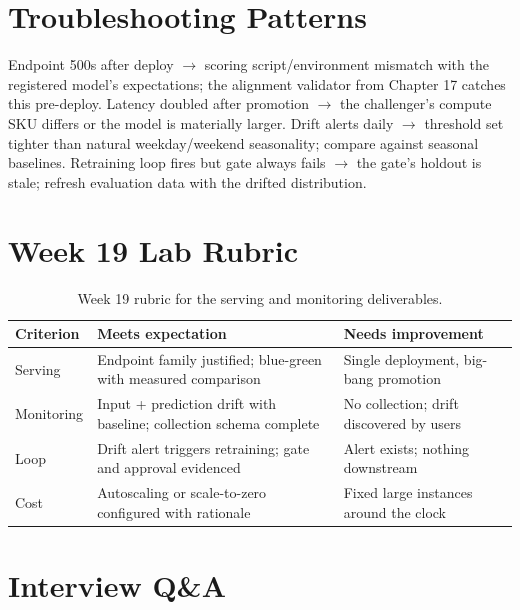 \section{Troubleshooting Patterns}
Endpoint 500s after deploy $\rightarrow$ scoring script/environment mismatch with the registered model's expectations; the alignment validator from Chapter 17 catches this pre-deploy. Latency doubled after promotion $\rightarrow$ the challenger's compute SKU differs or the model is materially larger. Drift alerts daily $\rightarrow$ threshold set tighter than natural weekday/weekend seasonality; compare against seasonal baselines. Retraining loop fires but gate always fails $\rightarrow$ the gate's holdout is stale; refresh evaluation data with the drifted distribution.

\section{Week 19 Lab Rubric}
\begin{table}[H]
\centering
\small
\begin{tabular}{@{}p{3.2cm}p{5.0cm}p{5.0cm}@{}}
\toprule
\textbf{Criterion} & \textbf{Meets expectation} & \textbf{Needs improvement} \\
\midrule
Serving & Endpoint family justified; blue-green with measured comparison & Single deployment, big-bang promotion \\
Monitoring & Input + prediction drift with baseline; collection schema complete & No collection; drift discovered by users \\
Loop & Drift alert triggers retraining; gate and approval evidenced & Alert exists; nothing downstream \\
Cost & Autoscaling or scale-to-zero configured with rationale & Fixed large instances around the clock \\
\bottomrule
\end{tabular}
\caption{Week 19 rubric for the serving and monitoring deliverables.}
\label{tab:ch19-rubric}
\end{table}

\section{Interview Q\&A}
